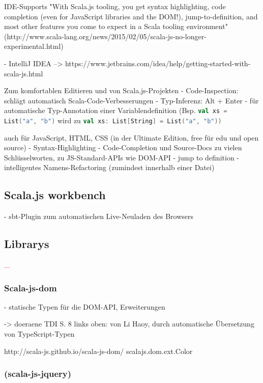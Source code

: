 \documentclass[a4paper, 12pt, hidelinks, listof=totoc, listoftables=totoc, bibliography=totoc]{scrreprt}
\newcommand{\scala}[1]{\lstinline[language=Scala, style=inline]|#1|}
\newcommand{\TODO}[1]{\textcolor{red}{#1}\newline}
\begin{document}
\ac{IDE}-Supports
  "With Scala.js tooling, you get syntax highlighting, code completion (even for JavaScript libraries and the \ac{DOM}!), jump-to-definition, and most other features you come to expect in a Scala tooling environment" (http://www.scala-lang.org/news/2015/02/05/scala-js-no-longer-experimental.html)

  - IntelliJ IDEA  -->  https://www.jetbrains.com/idea/help/getting-started-with-scala-js.html

    Zum komfortablen Editieren und von Scala.js-Projekten
    - Code-Inspection: schlägt automatisch Scala-Code-Verbesserungen
    - Typ-Inferenz: Alt + Enter - für automatische Typ-Annotation einer Variablendefinition (Bsp. \scala{val xs = List("a", "b")} wird zu \scala{val xs: List[String] = List("a", "b"))}

    auch für JavaScript, HTML, CSS (in der Ultimate Edition, free für edu und open source)
      - Syntax-Highlighting
      - Code-Completion und Source-Docs zu vielen Schlüsselworten, zu JS-Standard-\ac{API}s wie \ac{DOM}-\ac{API}
      - jump to definition
      - intelligentes Namens-Refactoring (zumindest innerhalb einer Datei)





\subsection{Scala.js workbench}

- sbt-Plugin zum automatischen Live-Neuladen des Browsers






\subsection{Librarys}


\TODO{...}


\subsubsection{Scala-js-dom}

- statische Typen für die \ac{DOM}-\ac{API}, Erweiterungen

-> doeraene TDI S. 8 links oben:
	von Li Haoy, durch automatische Übersetzung von TypeScript-Typen

http://scala-js.github.io/scala-js-dom/
scalajs.dom.ext.Color

\subsubsection{(scala-js-jquery)}
\end{document}
